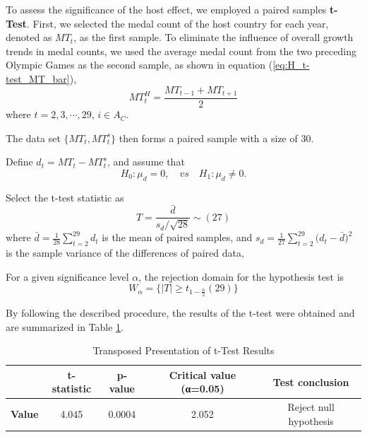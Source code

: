 \documentclass{mcmthesis}
\begin{document}
	
	To assess the significance of the host effect, we employed a paired samples  \textbf{t-Test}. First, we selected the medal count of the host country for each year, denoted as $MT_{t}$, as the first sample. To eliminate the influence of overall growth trends in medal counts, we used the average medal count from the two preceding Olympic Games as the second sample, as shown in equation (\ref{eq:H_t-test_MT_bar}),
	\begin{equation}
		MT^H_{t}=\frac{ MT_{t-1} + MT_{t+1} }{2}
		\label{eq:H_t-test_MT_bar}
	\end{equation}
	where $t=2,3,\cdots,29$, $i\in A_{C}$. 
	
	The data set $\{MT_{t},MT^s_{t}\}$ then forms a paired sample with a size of 30. 
	
	Define $d_t= MT_{t} - MT^s_{t}$, and assume that
	\begin{equation*}
		H_0: \mu_d=0, \quad vs \quad H_1:  \mu_d \ne 0.
	\end{equation*}
	
	Select the t-test statistic as
	\begin{equation}
		T=\frac{ \bar{d} }{ s_d\slash \sqrt{28} } \sim (27)
	\end{equation}
	where $\bar{d}=\frac{1}{28} \sum_{t=2}^{29} d_t$ is the mean of paired samples, 
	and $ s_d = \frac{1}{27} \sum_{t=2}^{29}\big( d_t - \bar{d} \big)^2 $ is the sample variance of the differences of paired data, 
	
	For a given significance level $\alpha$, the rejection domain for the hypothesis test is
	\begin{equation}
		W_\alpha = \big\{ |T| \ge t_{1-\frac{\alpha}{2}}(29) \big\}
	\end{equation}
	
	By following the described procedure, the results of the t-test were obtained and are summarized in Table \ref{1}.


\begin{table}[H]
	\centering
	\caption{Transposed Presentation of t-Test Results}
	\label{table:H_t-test_result_transposed}
	\begin{tabular}{lcccc}
		\toprule
		\rowcolor{red!10}
		& \textbf{t-statistic} & \textbf{p-value} & \textbf{Critical value (α=0.05)} & \textbf{Test conclusion} \\
		\midrule
		\rowcolor{white} %
		\textbf{Value} & 4.045 & 0.0004 & 2.052 & Reject null hypothesis \\
		\bottomrule
	\end{tabular}
	\label{1}
\end{table}
	
\end{document}
